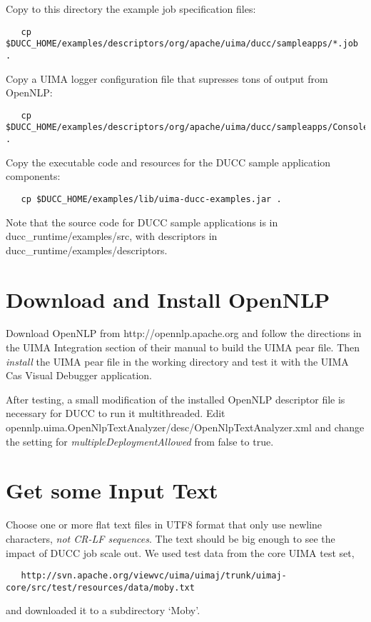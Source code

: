 Copy to this directory the example job specification files:
\begin{verbatim}
   cp $DUCC_HOME/examples/descriptors/org/apache/uima/ducc/sampleapps/*.job .
\end{verbatim}

Copy a UIMA logger configuration file that supresses tons of output from OpenNLP:
\begin{verbatim}
   cp $DUCC_HOME/examples/descriptors/org/apache/uima/ducc/sampleapps/ConsoleLogger.properties .
\end{verbatim}

Copy the executable code and resources for the DUCC sample application components:
\begin{verbatim}
   cp $DUCC_HOME/examples/lib/uima-ducc-examples.jar .
\end{verbatim}

Note that the source code for DUCC sample applications is in ducc\_runtime/examples/src,
with descriptors in ducc\_runtime/examples/descriptors.

\section{Download and Install OpenNLP}
Download OpenNLP from http://opennlp.apache.org and follow the directions in the
UIMA Integration section of their manual to build the UIMA pear file.
Then {\em install} the UIMA pear file in the working directory and
test it with the UIMA Cas Visual Debugger application.

After testing, a small modification of the installed OpenNLP descriptor file
is necessary for DUCC to run it multithreaded. 
Edit opennlp.uima.OpenNlpTextAnalyzer/desc/OpenNlpTextAnalyzer.xml
and change the setting for {\em multipleDeploymentAllowed} from false to true.

\section{Get some Input Text}
Choose one or more flat text files in UTF8 format that only use newline characters,
{\em not CR-LF sequences}.
The text should be big enough to see the impact of DUCC job scale out.
We used test data from the core UIMA test set,
\begin{verbatim}
   http://svn.apache.org/viewvc/uima/uimaj/trunk/uimaj-core/src/test/resources/data/moby.txt
\end{verbatim}
and downloaded it to a subdirectory `Moby'.

